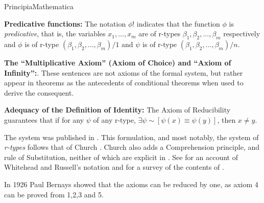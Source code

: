 \begin{entry}{PrincipiaMathematica}
\begin{clarifications}
{\bf Predicative functions:} The notation $\phi !$ indicates that the function $\phi$ is {\em predicative}, that is,  the variables $x_1, \ldots , x_m$ are of r-types $\beta_1, \beta_2, \ldots, \beta_m$ respectively and $\phi$ is of r-type $(\beta_1, \beta_2, \ldots, \beta_m )/1 $ and $\psi$ is of r-type $(\beta_1, \beta_2, \ldots, \beta_m) /n $. 

{\bf The ``Multiplicative Axiom'' (Axiom of Choice)  and ``Axiom of Infinity'':}. These sentences are not axioms of the formal system, but rather appear in theorems as the antecedents of conditional theorems when used to derive the consequent. 

{\bf Adequacy of the Definition of Identity:} The Axiom of Reducibility guarantees that if for any $\psi$ of any r-type,  $\exists \psi \sim \! [\psi (x) \equiv \psi (y)] $, then $x \neq y$. 
\end{clarifications}

\begin{history}
The system was published in \cite{PrincipiaMathematica}. This formulation, and most notably, the system of {\em r-types} follows that of Church \cite{Church}. Church also adds a Comprehension principle, and rule of Substitution, neither of which are explicit in \cite{PrincipiaMathematica}. See \cite{LinskySEPNotation} for an account of Whitehead and Russell's notation and \cite{LinskySEP} for a survey of the contents of \cite{PrincipiaMathematica}.
\end{history}

\begin{technicalities}
In 1926 Paul Bernays \cite{Bernays} showed that the axioms can be reduced by one, as axiom 4 can be proved from 1,2,3 and 5.
\end{technicalities}

\end{entry}
